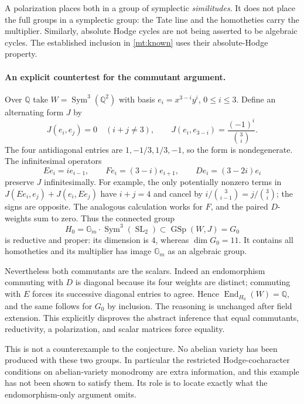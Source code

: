 \documentclass[11pt]{article}
\begin{document}
A polarization places both in a group of symplectic \emph{similitudes}.
It does not place the full groups in a symplectic group: the Tate line
and the homotheties carry the multiplier. Similarly, absolute Hodge
cycles are not being asserted to be algebraic cycles. The established
inclusion in \eqref{mt:known} uses their absolute-Hodge property.

\paragraph{An explicit countertest for the commutant argument.}
Over $\mathbb Q$ take $W=\operatorname{Sym}^3(\mathbb Q^2)$ with basis
$e_i=x^{3-i}y^i$, $0\leq i\leq3$. Define an alternating form $J$ by
\[
 J(e_i,e_j)=0\quad(i+j\ne3),\qquad
 J(e_i,e_{3-i})=\frac{(-1)^i}{\binom3i}.
\]
The four antidiagonal entries are $1,-1/3,1/3,-1$, so the form is
nondegenerate. The infinitesimal operators
\[
 E e_i=i e_{i-1},\qquad F e_i=(3-i)e_{i+1},\qquad
 D e_i=(3-2i)e_i
\]
preserve $J$ infinitesimally. For example, the only potentially nonzero
terms in $J(Ee_i,e_j)+J(e_i,Ee_j)$ have $i+j=4$ and cancel by
$i/\binom3{i-1}=j/\binom3i$; the signs are opposite. The analogous
calculation works for $F$, and the paired $D$-weights sum to zero.
Thus the connected group
\[
 H_0=\mathbb G_m\cdot\operatorname{Sym}^3(\operatorname{SL}_2)
 \subset \operatorname{GSp}(W,J)=G_0
\]
is reductive and proper: its dimension is $4$, whereas $\dim G_0=11$.
It contains all homotheties and its multiplier has image $\mathbb G_m$
as an algebraic group.

Nevertheless both commutants are the scalars. Indeed an endomorphism
commuting with $D$ is diagonal because its four weights are distinct;
commuting with $E$ forces its successive diagonal entries to agree.
Hence $\operatorname{End}_{H_0}(W)=\mathbb Q$, and the same follows
for $G_0$ by inclusion. The reasoning is unchanged after field
extension. This explicitly disproves the abstract inference that
equal commutants, reductivity, a polarization, and scalar matrices
force equality.

This is not a counterexample to the conjecture. No abelian variety has
been produced with these two groups. In particular the restricted
Hodge-cocharacter conditions on abelian-variety monodromy are extra
information, and this example has not been shown to satisfy them.
Its role is to locate exactly what the endomorphism-only argument omits.
\end{document}
